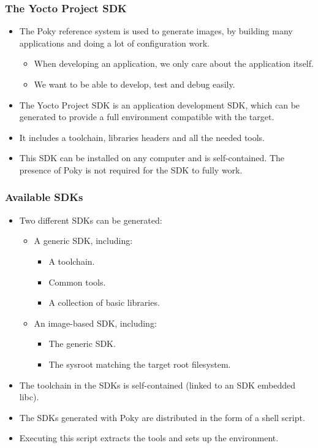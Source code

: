 \begin{frame}
  \frametitle{The Yocto Project SDK}
  \begin{itemize}
    \item The Poky reference system is used to generate images, by
      building many applications and doing a lot of configuration work.
      \begin{itemize}
        \item When developing an application, we only care about the
          application itself.
        \item We want to be able to develop, test and debug easily.
      \end{itemize}
    \item The Yocto Project SDK is an application development SDK,
      which can be generated to provide a full environment compatible
      with the target.
    \item It includes a toolchain, libraries headers and all the
      needed tools.
    \item This SDK can be installed on any computer and is
      self-contained. The presence of Poky is not required for the SDK
      to fully work.
  \end{itemize}
\end{frame}

\begin{frame}
  \frametitle{Available SDKs}
  \begin{itemize}
    \item Two different SDKs can be generated:
      \begin{itemize}
        \item A generic SDK, including:
          \begin{itemize}
            \item A toolchain.
            \item Common tools.
            \item A collection of basic libraries.
          \end{itemize}
        \item An image-based SDK, including:
          \begin{itemize}
            \item The generic SDK.
            \item The sysroot matching the target root filesystem.
          \end{itemize}
      \end{itemize}
    \item The toolchain in the SDKs is self-contained (linked to an SDK
      embedded libc).
    \item The SDKs generated with Poky are distributed in the form of a
      shell script.
    \item Executing this script extracts the tools and sets up the
      environment.
  \end{itemize}
\end{frame}

